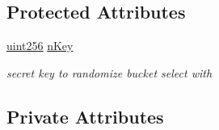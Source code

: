 \subsection*{Protected Attributes}
\begin{DoxyCompactItemize}
\item 
\mbox{\hyperlink{classuint256}{uint256}} \mbox{\hyperlink{class_c_addr_man_adcb5b2b86ea5739730b111c89e84e965}{n\+Key}}
\begin{DoxyCompactList}\small\item\em secret key to randomize bucket select with \end{DoxyCompactList}\end{DoxyCompactItemize}
\subsection*{Private Attributes}
